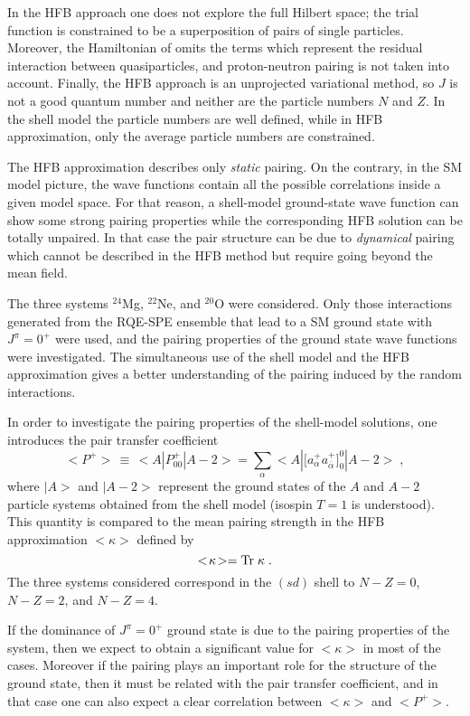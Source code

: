 \documentclass[rmp,preprint,aps,floatfix]{revtex4}
\begin{document}
In the HFB approach
one does not explore the full Hilbert space; the trial function
is constrained to be a superposition of pairs of single particles.
Moreover, the Hamiltonian of \cite{ben02} omits
the terms which represent the residual interaction between quasiparticles, 
and proton-neutron pairing is not taken into account.
Finally, the HFB approach is an unprojected
variational method, so $J$ is not a good quantum number
and neither are the particle numbers $N$ and $Z$.
In the shell model the particle numbers are well defined, while in HFB
approximation, only the average particle numbers are constrained.

The HFB approximation describes
only {\it static} pairing. On the contrary, in the SM model picture, the
wave functions contain all the possible correlations inside a given model
space. For that reason, a shell-model ground-state 
wave function can show some strong pairing
properties while the corresponding HFB solution can be totally unpaired.
In that case the pair structure can be due to {\it dynamical} pairing
which cannot be described in the HFB method but require going beyond
the mean field.

The three 
systems $^{24}$Mg, $^{22}$Ne, and $^{20}$O were considered. 
Only those interactions generated from the RQE-SPE ensemble
that lead to a SM ground state with $J^\pi=0^+$ were used,
and 
the pairing properties of the ground state
wave functions were investigated. The simultaneous use of the shell model 
and the HFB approximation gives a better understanding of the pairing
induced by the random interactions.

In order to investigate the pairing properties of the shell-model
solutions, one introduces the pair transfer coefficient
%
\begin{equation}
<P^+>\,\equiv\,<A|P^+_{00}|A-2>
=\sum_{\alpha}<A|\big[a_\alpha^+a_{\bar\alpha}^+\big]^0_0|A-2>\;,
\end{equation}
%
where $|A>$ and $|A-2>$ represent the ground states of the $A$ and $A-2$
particle systems obtained from the shell model (isospin $T=1$ is understood).
This quantity is compared
to the mean pairing strength in the HFB approximation $<\kappa>$ defined
by
%
\begin{equation}
<\!\kappa\!>={\rm Tr}\;\kappa\;.
\end{equation}
%
The three systems considered correspond
in the $(sd)$ shell to $N-Z=0$, $N-Z=2$, and
$N-Z=4$. 

If the dominance of $J^\pi=0^+$ ground state is due to the pairing
properties of the system, then we expect to obtain a significant value
for $<\!\kappa\!>$ in most of the cases. Moreover if the pairing plays
an important role for the structure of the ground state, then it must
be related with the pair transfer coefficient, and in that case one can
also expect a clear correlation between $<\!\kappa\!>$ and $<\!P^+\!>$.
\end{document}

